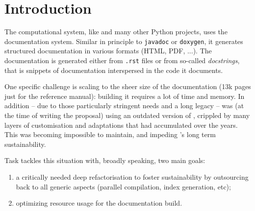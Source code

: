 \documentclass{deliverablereport}
\author{Jeroen Demeyer}
\begin{document}
\maketitle
\tableofcontents


\section{Introduction}

The \Sage computational system, like \Python and many other Python
projects, uses the \Sphinx documentation system. Similar in principle
to \lstinline{javadoc} or \lstinline{doxygen}, it generates structured
documentation in various formats (HTML, PDF, ...).
The documentation is generated either from \texttt{.rst} files
or from so-called \emph{docstrings}, that is snippets of documentation
interspersed in the code it documents.

One specific challenge is scaling to the sheer size of the \Sage
documentation (13k pages just for the reference manual): building it
requires a lot of time and memory. In addition -- due to those particularly
stringent needs and a long legacy -- \Sage was (at the time of writing
the proposal) using an outdated version of \Sphinx, crippled by many
layers of customisation and adaptations that had accumulated over the
years. This was becoming impossible to maintain, and impeding
\Sage's long term sustainability.

Task  tackles this situation with, broadly
speaking, two main goals:
\begin{enumerate}
\item a critically needed deep refactorisation to
  foster sustainability by outsourcing back to
  \Sphinx all generic aspects (parallel compilation, index generation,
  etc);
\item optimizing resource usage for the documentation build.
\end{enumerate}
\end{document}
